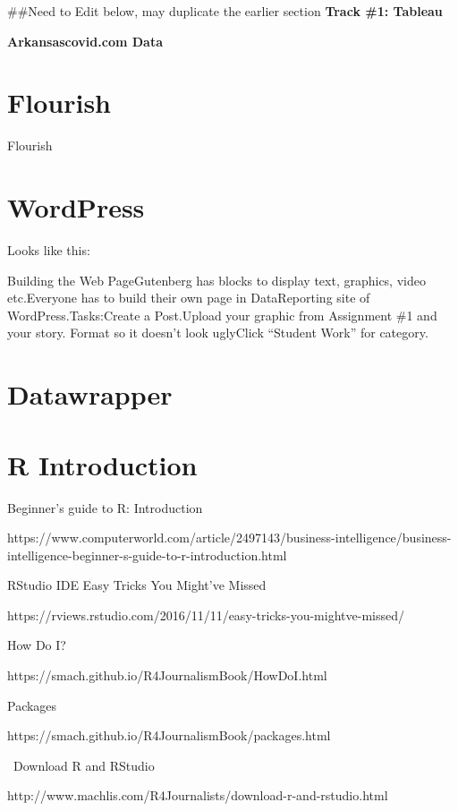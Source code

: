 \documentclass[]{book}
\begin{document}
\#\#Need to Edit below, may duplicate the earlier section
\textbf{Track \#1: Tableau}

\textbf{Arkansascovid.com Data}

\hypertarget{flourish}{%
\chapter{Flourish}\label{flourish}}

Flourish

\hypertarget{wordpress}{%
\chapter{WordPress}\label{wordpress}}

Looks like this:

Building the Web PageGutenberg has blocks to display text, graphics, video etc.Everyone has to build their own page in DataReporting site of WordPress.Tasks:Create a Post.Upload your graphic from Assignment \#1 and your story. Format so it doesn't look uglyClick ``Student Work'' for category.

\hypertarget{datawrapper}{%
\chapter{Datawrapper}\label{datawrapper}}

\hypertarget{r-introduction}{%
\chapter{R Introduction}\label{r-introduction}}

Beginner's guide to R: Introduction

https://www.computerworld.com/article/2497143/business-intelligence/business-intelligence-beginner-s-guide-to-r-introduction.html

RStudio IDE Easy Tricks You Might've Missed

https://rviews.rstudio.com/2016/11/11/easy-tricks-you-mightve-missed/

How Do I?

https://smach.github.io/R4JournalismBook/HowDoI.html

Packages

https://smach.github.io/R4JournalismBook/packages.html

~Download R and RStudio

http://www.machlis.com/R4Journalists/download-r-and-rstudio.html
\end{document}
